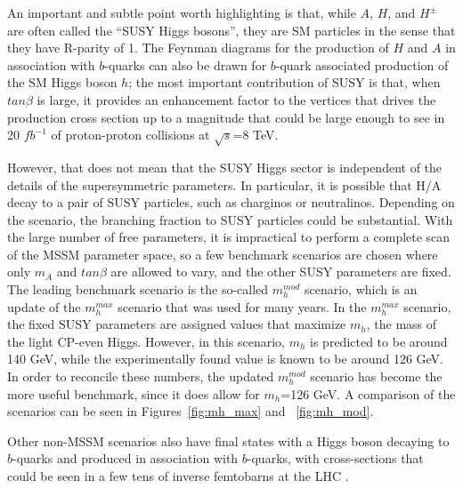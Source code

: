 An important and subtle point worth highlighting is that, while 
$A$, $H$, and $H^\pm$ are often called the ``SUSY Higgs bosons'', 
they are SM particles in the sense that they have R-parity of 1.  
The Feynman diagrams for the production of $H$ and $A$ 
in association with $b$-quarks can also be drawn for 
$b$-quark associated production of the SM Higgs boson $h$; 
the most important contribution of SUSY is that, when $tan\beta$ 
is large, it provides an enhancement factor to the vertices that 
drives the production cross section up to a magnitude that could be 
large enough to see in 20 $fb^{-1}$ of proton-proton collisions at $\sqrt{s}$=8 TeV.

However, that does not mean that the SUSY Higgs sector is 
independent of the details of the supersymmetric parameters.  In particular, 
it is possible that H/A decay to a pair of 
SUSY particles, such as charginos or neutralinos.  Depending on the 
scenario, the branching fraction to SUSY particles could be substantial.  
With the large number of free parameters, it is impractical to 
perform a complete scan of the MSSM parameter space, so a 
few benchmark scenarios are chosen where only $m_A$ 
and $tan\beta$ are allowed to vary, and 
the other SUSY parameters are fixed.  The leading benchmark scenario is 
the so-called $m_h^{mod}$ scenario, 
which is an update of the $m_h^{max}$ 
scenario that was used for many years.  In the $m_h^{max}$ 
scenario, the fixed SUSY parameters are assigned values that maximize $m_h$, 
the mass of the light CP-even Higgs.  However, 
in this scenario, $m_h$ is predicted to 
be around 140 GeV, while the experimentally found value is known 
to be around 126 GeV.  In order to reconcile these numbers, 
the updated $m_h^{mod}$ scenario has become 
the more useful benchmark, since it does allow for $m_h$=126 GeV.  
A comparison of the scenarios can be seen in Figures~\ref{fig:mh_max} and ~\ref{fig:mh_mod}.

Other non-MSSM scenarios also have final states with a Higgs boson
decaying to $b$-quarks and produced in association with $b$-quarks,
with cross-sections that could be seen in a few tens of inverse 
femtobarns at the LHC \cite{Gori}.  










